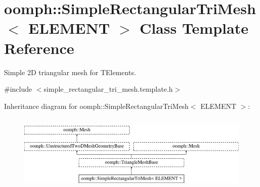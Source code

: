\hypertarget{classoomph_1_1SimpleRectangularTriMesh}{}\section{oomph\+:\+:Simple\+Rectangular\+Tri\+Mesh$<$ E\+L\+E\+M\+E\+NT $>$ Class Template Reference}
\label{classoomph_1_1SimpleRectangularTriMesh}


Simple 2D triangular mesh for T\+Elements.  




{\ttfamily \#include $<$simple\+\_\+rectangular\+\_\+tri\+\_\+mesh.\+template.\+h$>$}

Inheritance diagram for oomph\+:\+:Simple\+Rectangular\+Tri\+Mesh$<$ E\+L\+E\+M\+E\+NT $>$\+:\begin{figure}[H]
\begin{center}
\leavevmode
\includegraphics[height=3.783784cm]{classoomph_1_1SimpleRectangularTriMesh}
\end{center}
\end{figure}
